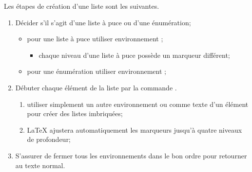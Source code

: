 \begin{exemple}
  Les étapes de création d'une liste sont les suivantes.
  \begin{enumerate}
  \item Décider s'il s'agit d'une liste à puce ou d'une énumération;
    \begin{itemize}
    \item pour une liste à puce utiliser environnement ;
      \begin{itemize}
      \item chaque niveau d'une liste à puce possède un marqueur
        différent;
      \end{itemize}
    \item pour une énumération utiliser environnement ;
    \end{itemize}
  \item Débuter chaque élément de la liste par la commande
    \cmdprint{\item}.
    \begin{enumerate}
    \item utiliser simplement un autre environnement  ou
       comme texte d'un élément pour créer des listes
      imbriquées;
    \item {\LaTeX} ajustera automatiquement les marqueurs jusqu'à
      quatre niveaux de profondeur;
    \end{enumerate}
  \item S'assurer de fermer tous les environnements dans le bon ordre
    pour retourner au texte normal.
  \end{enumerate}


\end{exemple}
